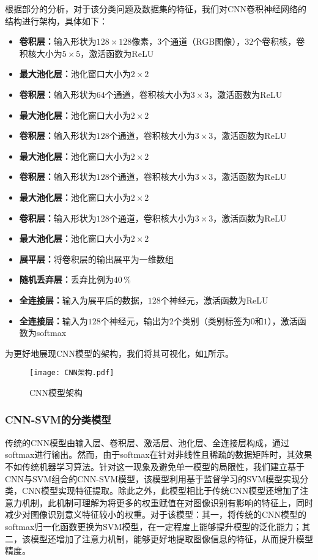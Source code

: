 \documentclass{MathorCupmodeling}
\begin{document}
	根据\textcolor{blue}{}部分的分析，对于该分类问题及数据集的特征，我们对CNN卷积神经网络的结构进行架构，具体如下：
	\begin{itemize}
		\item \textbf{卷积层：}输入形状为$128\times 128$像素，$3$个通道（RGB图像），$32$个卷积核，卷积核大小为$5\times 5$，激活函数为ReLU
		\item \textbf{最大池化层：}池化窗口大小为$2\times 2$
		\item \textbf{卷积层：}输入形状为$64$个通道，卷积核大小为$3\times 3$，激活函数为ReLU
		\item \textbf{最大池化层：}池化窗口大小为$2\times 2$
		\item \textbf{卷积层：}输入形状为$128$个通道，卷积核大小为$3\times 3$，激活函数为ReLU
		\item \textbf{最大池化层：}池化窗口大小为$2\times 2$
		\item \textbf{卷积层：}输入形状为$128$个通道，卷积核大小为$3\times 3$，激活函数为ReLU
		\item \textbf{最大池化层：}池化窗口大小为$2\times 2$
		\item \textbf{卷积层：}输入形状为$128$个通道，卷积核大小为$3\times 3$，激活函数为ReLU
		\item \textbf{最大池化层：}池化窗口大小为$2\times 2$
		\item \textbf{展平层：}将卷积层的输出展平为一维数组
		\item \textbf{随机丢弃层：}丢弃比例为$40\,\%$
		\item \textbf{全连接层：}输入为展平后的数据，$128$个神经元，激活函数为ReLU
		\item \textbf{全连接层：}输入为$128$个神经元，输出为$2$个类别（类别标签为$0$和$1$），激活函数为softmax
	\end{itemize}
	
	为更好地展现CNN模型的架构，我们将其可视化，如\textcolor{blue}{\cref{fig:CNN模型架构}}所示。
	\begin{figure}[H]
		\centering
		\texttt{[image: CNN架构.pdf]}
		\caption{CNN模型架构}
		\label{fig:CNN模型架构}
	\end{figure}
	\subsubsection{CNN-SVM的分类模型}
	传统的CNN模型由输入层、卷积层、激活层、池化层、全连接层构成，通过softmax进行输出。然而，由于softmax在针对非线性且稀疏的数据矩阵时，其效果不如传统机器学习算法\textcolor{blue}{\cite{ZHANGP}}。针对这一现象及避免单一模型的局限性，我们建立基于CNN与SVM组合的CNN-SVM模型，该模型利用基于监督学习的SVM模型实现分类，CNN模型实现特征提取。除此之外，此模型相比于传统CNN模型还增加了注意力机制\textcolor{blue}{\cite{李毅泉}}，此机制可理解为将更多的权重赋值在对图像识别有影响的特征上，同时减少对图像识别意义特征较小的权重。对于该模型：其一，将传统的CNN模型的softmax归一化函数更换为SVM模型，在一定程度上能够提升模型的泛化能力\textcolor{blue}{\cite{何铠}}；其二，该模型还增加了注意力机制，能够更好地提取图像信息的特征，从而提升模型精度。
\end{document}
